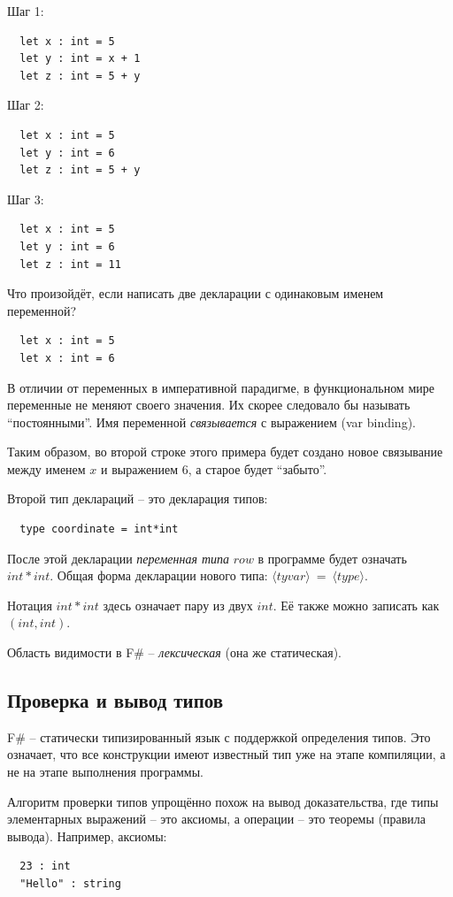 \documentclass[a4paper,11pt]{article}
\begin{document}
Шаг 1:
\begin{lstlisting}
  let x : int = 5
  let y : int = x + 1
  let z : int = 5 + y
\end{lstlisting}

Шаг 2:
\begin{lstlisting}
  let x : int = 5
  let y : int = 6
  let z : int = 5 + y
\end{lstlisting}

Шаг 3:
\begin{lstlisting}
  let x : int = 5
  let y : int = 6
  let z : int = 11
\end{lstlisting}

Что произойдёт, если написать две декларации с одинаковым именем переменной?
\begin{lstlisting}
  let x : int = 5
  let x : int = 6
\end{lstlisting}

В отличии от переменных в императивной парадигме, в функциональном мире
переменные не меняют своего значения. Их скорее следовало бы называть
``постоянными''. Имя переменной \emph{связывается} с выражением (var binding).

Таким образом, во второй строке этого примера будет создано новое 
связывание между именем $x$ и выражением $6$, а старое будет ``забыто''.

Второй тип деклараций -- это декларация типов:
\begin{lstlisting}
  type coordinate = int*int
\end{lstlisting}

После этой декларации \emph{переменная типа} $row$ в программе будет означать
$int * int$. Общая форма декларации нового типа: $\langle tyvar \rangle~=~
\langle type \rangle$.

Нотация $int * int$ здесь означает пару из двух $int$. Её также можно записать
как $(int, int)$.

Область видимости в F\# -- \emph{лексическая} (она же статическая). 

\subsection{Проверка и вывод типов}

F\# -- статически типизированный язык с поддержкой определения типов. Это 
означает, что все конструкции имеют известный тип уже на этапе компиляции, а не
на этапе выполнения программы.

Алгоритм проверки типов упрощённо похож на вывод доказательства, где типы
элементарных выражений -- это аксиомы, а операции -- это теоремы (правила 
вывода). Например, аксиомы:
\begin{lstlisting}
  23 : int
  "Hello" : string
\end{lstlisting}
\end{document}

